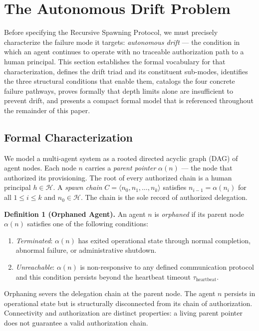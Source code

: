 \section{The Autonomous Drift Problem}
\label{sec:rs-drift}

Before specifying the Recursive Spawning Protocol, we must precisely characterize the failure mode it targets: \emph{autonomous drift} — the condition in which an agent continues to operate with no traceable authorization path to a human principal. This section establishes the formal vocabulary for that characterization, defines the drift triad and its constituent sub-modes, identifies the three structural conditions that enable them, catalogs the four concrete failure pathways, proves formally that depth limits alone are insufficient to prevent drift, and presents a compact formal model that is referenced throughout the remainder of this paper.

\subsection{Formal Characterization}
\label{sec:rs-drift-formal}

We model a multi-agent system as a rooted directed acyclic graph (DAG) of agent nodes. Each node $n$ carries a \emph{parent pointer} $\alpha(n)$ — the node that authorized its provisioning. The root of every authorized chain is a human principal $h \in \mathcal{H}$. A \emph{spawn chain} $C = \langle n_0, n_1, \ldots, n_k \rangle$ satisfies $n_{i-1} = \alpha(n_i)$ for all $1 \leq i \leq k$ and $n_0 \in \mathcal{H}$. The chain is the sole record of authorized delegation.

\medskip
\noindent\textbf{Definition 1 (Orphaned Agent).}
An agent $n$ is \emph{orphaned} if its parent node $\alpha(n)$ satisfies one of the following conditions:
\begin{enumerate}
  \item[(a)] \emph{Terminated}: $\alpha(n)$ has exited operational state through normal completion, abnormal failure, or administrative shutdown.
  \item[(b)] \emph{Unreachable}: $\alpha(n)$ is non-responsive to any defined communication protocol and this condition persists beyond the heartbeat timeout $\tau_{\mathrm{heartbeat}}$.
\end{enumerate}
Orphaning severs the delegation chain at the parent node. The agent $n$ persists in operational state but is structurally disconnected from its chain of authorization. Connectivity and authorization are distinct properties: a living parent pointer does not guarantee a valid authorization chain.

